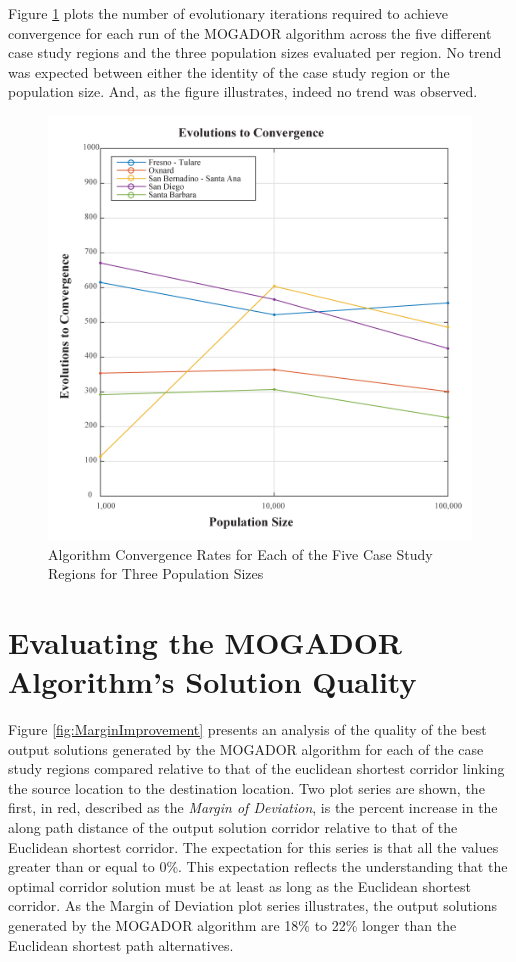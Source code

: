 Figure \ref{fig:Evolutions} plots the number of evolutionary iterations required to achieve convergence for each run of the MOGADOR algorithm across the five different case study regions and the three population sizes evaluated per region. No trend was expected between either the identity of the case study region or the population size. And, as the figure illustrates, indeed no trend was observed. 
    
    \begin{figure}[!h]
        \begin{center}
        \includegraphics[width=5.5in]{figures/Evolutions.png}
        \caption{Algorithm Convergence Rates for Each of the Five Case Study Regions for Three Population Sizes}
        \label{fig:Evolutions}
        \end{center}
    \end{figure}

\section{Evaluating the MOGADOR Algorithm's Solution Quality}

Figure \ref{fig:MarginImprovement} presents an analysis of the quality of the best output solutions generated by the MOGADOR algorithm for each of the case study regions compared relative to that of the euclidean shortest corridor linking the source location to the destination location. Two plot series are shown, the first, in red, described as the \textit{Margin of Deviation}, is the percent increase in the along path distance of the output solution corridor relative to that of the Euclidean shortest corridor. The expectation for this series is that all the values greater than or equal to 0\%. This expectation reflects the understanding that the optimal corridor solution must be at least as long as the Euclidean shortest corridor. As the Margin of Deviation plot series illustrates, the output solutions generated by the MOGADOR algorithm are 18\% to 22\% longer than the Euclidean shortest path alternatives.


